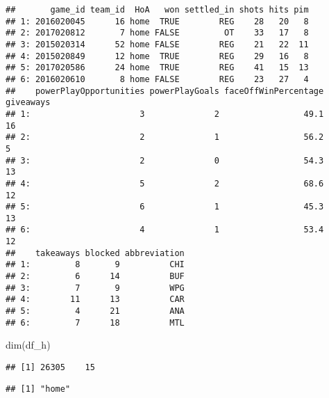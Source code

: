 \documentclass[
]{article}
\newenvironment{Shaded}{\begin{snugshade}}{\end{snugshade}}
\newcommand{\FunctionTok}[1]{\textcolor[rgb]{0.00,0.00,0.00}{#1}}
\newcommand{\NormalTok}[1]{#1}
\newcommand{\OtherTok}[1]{\textcolor[rgb]{0.56,0.35,0.01}{#1}}
\newcommand{\SpecialCharTok}[1]{\textcolor[rgb]{0.00,0.00,0.00}{#1}}
\newcommand{\StringTok}[1]{\textcolor[rgb]{0.31,0.60,0.02}{#1}}
\begin{document}
\begin{verbatim}
##       game_id team_id  HoA   won settled_in shots hits pim
## 1: 2016020045      16 home  TRUE        REG    28   20   8
## 2: 2017020812       7 home FALSE         OT    33   17   8
## 3: 2015020314      52 home FALSE        REG    21   22  11
## 4: 2015020849      12 home  TRUE        REG    29   16   8
## 5: 2017020586      24 home  TRUE        REG    41   15  13
## 6: 2016020610       8 home FALSE        REG    23   27   4
##    powerPlayOpportunities powerPlayGoals faceOffWinPercentage giveaways
## 1:                      3              2                 49.1        16
## 2:                      2              1                 56.2         5
## 3:                      2              0                 54.3        13
## 4:                      5              2                 68.6        12
## 5:                      6              1                 45.3        13
## 6:                      4              1                 53.4        12
##    takeaways blocked abbreviation
## 1:         8       9          CHI
## 2:         6      14          BUF
## 3:         7       9          WPG
## 4:        11      13          CAR
## 5:         4      21          ANA
## 6:         7      18          MTL
\end{verbatim}

\begin{Shaded}
\begin{Highlighting}[]
\FunctionTok{dim}\NormalTok{(df\_h)}
\end{Highlighting}
\end{Shaded}

\begin{verbatim}
## [1] 26305    15
\end{verbatim}

\begin{Shaded}
\end{Shaded}

\begin{verbatim}
## [1] "home"
\end{verbatim}

\begin{Shaded}
\end{Shaded}
\end{document}
